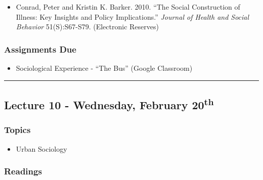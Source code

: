 \documentclass[]{book}
\providecommand{\tightlist}{%
  \setlength{\itemsep}{0pt}\setlength{\parskip}{0pt}}
\begin{document}
\begin{itemize}
\tightlist
\item
  Conrad, Peter and Kristin K. Barker. 2010. ``The Social Construction of Illness: Key Insights and Policy Implications.'' \emph{Journal of Health and Social Behavior} 51(S):S67-S79. (Electronic Reserves)
\end{itemize}

\hypertarget{assignments-due-2}{%
\subsubsection*{Assignments Due}\label{assignments-due-2}}

\begin{itemize}
\tightlist
\item
  Sociological Experience - ``The Bus'' (Google Classroom)
\end{itemize}

\begin{center}\rule{0.5\linewidth}{\linethickness}\end{center}

\hypertarget{lecture-10---wednesday-february-20th}{%
\subsection*{\texorpdfstring{Lecture 10 - Wednesday, February 20\textsuperscript{th}}{Lecture 10 - Wednesday, February 20th}}\label{lecture-10---wednesday-february-20th}}

\hypertarget{topics-11}{%
\subsubsection*{Topics}\label{topics-11}}

\begin{itemize}
\tightlist
\item
  Urban Sociology
\end{itemize}

\hypertarget{readings-10}{%
\subsubsection*{Readings}\label{readings-10}}
\end{document}
